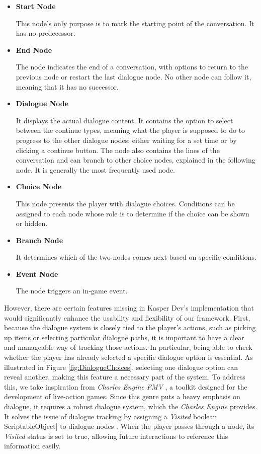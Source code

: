\begin{itemize}
    \item \textbf{Start Node}
    
This node's only purpose is to mark the starting point of the conversation. It has no predecessor.

    \item \textbf{End Node}

The node indicates the end of a conversation, with options to return to the previous node or restart the last dialogue node. No other node can follow it, meaning that it has no successor.

    \item \textbf{Dialogue Node}

It displays the actual dialogue content. It contains the option to select between the continue types, meaning what the player is supposed to do to progress to the other dialogue nodes: either waiting for a set time or by clicking a continue button. The node also contains the lines of the conversation and can branch to other choice nodes, explained in the following node. It is generally the most frequently used node.

    \item \textbf{Choice Node}

This node presents the player with dialogue choices. Conditions can be assigned to each node whose role is to determine if the choice can be shown or hidden.

    \item \textbf{Branch Node}

It determines which of the two nodes comes next based on specific conditions.

    \item \textbf{Event Node}

The node triggers an in-game event.
\end{itemize}

However, there are certain features missing in Kasper Dev's implementation that would significantly enhance the usability and flexibility of our framework. First, because the dialogue system is closely tied to the player’s actions, such as picking up items or selecting particular dialogue paths, it is important to have a clear and manageable way of tracking those actions. In particular, being able to check whether the player has already selected a specific dialogue option is essential. As illustrated in Figure \ref{fig:DialogueChoices}, selecting one dialogue option can reveal another, making this feature a necessary part of the system. To address this, we take inspiration from \textit{Charles Engine FMV} \cite{CharlesEngine}, a toolkit designed for the development of live-action games. Since this genre puts a heavy emphasis on dialogue, it requires a robust dialogue system, which the \textit{Charles Engine} provides. It solves the issue of dialogue tracking by assigning a \textit{Visited} boolean ScriptableObject| to dialogue nodes \cite{CharlesEngine-tut}. When the player passes through a node, its \textit{Visited} status is set to true, allowing future interactions to reference this information easily.

